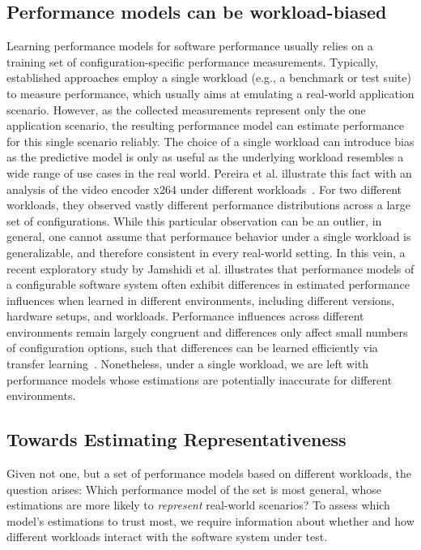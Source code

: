 \subsection*{Performance models can be workload-biased}
Learning performance models for software performance usually relies on a training set of configuration-specific performance measurements. 
Typically, established approaches employ a single workload (e.g., a benchmark or test suite) to measure performance, which usually aims at emulating a real-world application scenario. 
However, as the collected measurements represent only the one application scenario, the resulting performance model can  estimate performance for this single scenario reliably. 
The choice of a single workload can introduce bias as the predictive model is only as useful as the underlying workload resembles a wide range of use cases in the real world. 
Pereira et al. illustrate this fact with an analysis of the video encoder \textsc{x264} under different workloads~\cite{alves_sampling_2020}. 
For two different workloads, they observed vastly different performance distributions across a large set of configurations.
While this particular observation can be an outlier, in general, one cannot assume that performance behavior under a single workload is generalizable, and therefore consistent in every real-world setting.
In this vein, a recent exploratory study by Jamshidi et al.\cite{jamishidi_transfer_2017} illustrates that performance models of a configurable software system often exhibit differences in estimated performance influences when learned in different environments, including different versions, hardware setups, and workloads.
Performance  influences across different environments remain largely congruent and differences only affect small numbers of configuration options, such that differences can be learned efficiently via transfer learning~\cite{jamshidi_transfer_gp_2017,jamshidi_learning_2018}. 
Nonetheless, under a single workload, we are left with performance models whose estimations are potentially inaccurate for different environments.

\subsection*{Towards Estimating Representativeness}
Given not one, but a set of performance models based on different workloads, the question arises: Which performance model of the set is most general, whose estimations are more likely to \emph{represent} real-world scenarios? 
To assess which model's estimations to trust most, we require information about whether and how different workloads interact with the software system under test. 

